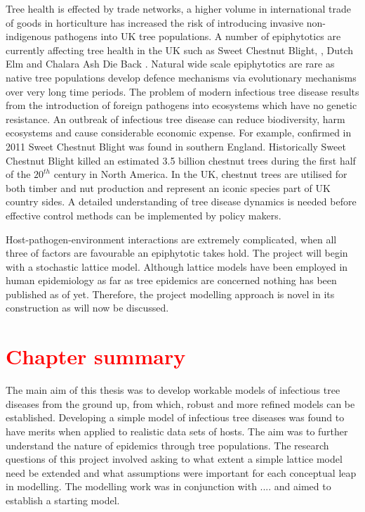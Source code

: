 Tree health is effected by trade networks, a higher volume in international trade of goods in horticulture has increased the risk of introducing invasive non-indigenous pathogens into UK tree populations. A number of epiphytotics are currently affecting tree health in the UK such as Sweet Chestnut Blight, \cite{MITCHELL201495, CB}, Dutch Elm \cite{DUTCH_ELM1,DUTCH_ELM2} and Chalara Ash Die Back \cite{ADB}. Natural wide scale epiphytotics are rare as native tree populations develop defence mechanisms via evolutionary mechanisms over very long time periods. The problem of modern infectious tree disease results from the introduction of foreign pathogens into ecosystems which have no genetic resistance. An outbreak of infectious tree disease can reduce biodiversity, harm ecosystems and cause considerable economic expense. For example, confirmed in 2011 Sweet Chestnut Blight was found in southern England. Historically Sweet Chestnut Blight killed an estimated 3.5 billion chestnut trees during the first half of the $20^{th}$ century in North America. In the UK, chestnut trees are utilised for both timber and nut production and represent an iconic species part of UK country sides. A detailed understanding of tree disease dynamics is needed before effective control methods can be implemented by policy makers.

Host-pathogen-environment interactions are extremely complicated, when all three of factors are favourable an epiphytotic takes hold. The project will begin with a stochastic lattice model. Although lattice models have been employed in human epidemiology as far as tree epidemics are concerned nothing has  been published as of yet. Therefore, the project modelling approach is novel in its construction as will now be discussed.


\section{\textcolor{red}{Chapter summary}}


The main aim of this thesis was to develop workable models of infectious tree diseases from the ground up, from which, robust and more refined models can be established. Developing a simple model of infectious tree diseases was found to have merits when applied to realistic data sets of hosts. The aim was to further understand the nature of epidemics through tree populations. The research questions of this project involved asking to what extent a simple lattice model need be extended and what assumptions were important for each conceptual leap in modelling. The modelling work was in conjunction with .... and aimed to establish a starting model.

